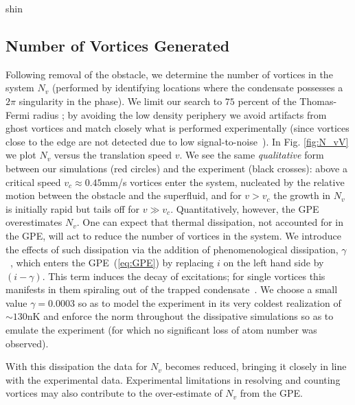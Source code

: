 \begin{chapter}{\label{cha:shin}shin}
\subsection{Number of Vortices Generated}
Following removal of the obstacle, we determine the number of vortices in the system $N_v$ (performed by identifying locations where the condensate possesses a $2\pi$ singularity in the phase).  
We limit our search to $75$ percent
 of the Thomas-Fermi radius ; by avoiding the low density periphery we avoid artifacts from ghost vortices and match closely what is performed experimentally (since vortices close to the edge are not detected due to low signal-to-noise~\citep{shin_private}).  In Fig. \ref{fig:N_vV} we plot $N_v$ versus the translation speed $v$.  We see the same {\it qualitative} form between our simulations (red circles) and the experiment (black crosses): above a critical speed $v_c \approx 0.45$mm/s vortices enter the system, nucleated by the relative motion between the obstacle and the superfluid, and for $v>v_c$ the growth in $N_v$ is initially rapid but tails off for $v\gg v_c$. Quantitatively, however, the GPE overestimates $N_v$.   One can expect that thermal dissipation, not accounted for in the GPE, will act to reduce the number of vortices in the system.  We introduce the effects of such dissipation via the addition of phenomenological dissipation, $\gamma$~\citep{choi_morgan_98,tsubota_kasamatsu_02}, which enters the GPE~(\ref{eq:GPE}) by replacing $i$ on the left hand side by $(i-\gamma)$.  This term induces the decay of excitations; for single vortices this manifests in them spiraling out of the trapped condensate~\citep{madarassy_barenghi_08,jackson_proukakis_09,allen_zaremba_13,yan_proukakis_14}.  
We choose a small value $\gamma = 0.0003$ so as to model the experiment in its very coldest realization of $\sim130$nK and enforce the norm throughout the dissipative simulations so as to emulate the experiment (for which no significant loss of atom number was observed).

 With this dissipation the data for $N_v$ becomes reduced, bringing it closely in line with the experimental data. Experimental limitations in resolving and counting vortices may also contribute to the over-estimate of $N_v$ from the GPE.



\end{chapter}
